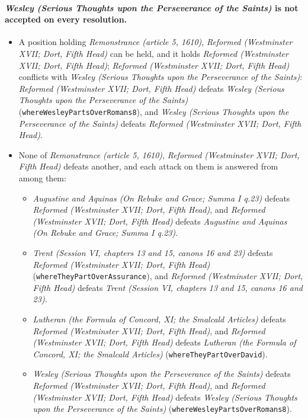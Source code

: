 \documentclass[11pt]{article}
\begin{document}
\paragraph{\emph{Wesley (Serious Thoughts upon the Perseverance of the Saints)} is not accepted on every resolution.}
\begin{itemize}
\item A position holding \emph{Remonstrance (article 5, 1610)}, \emph{Reformed (Westminster XVII; Dort, Fifth Head)} can be held, and it holds \emph{Reformed (Westminster XVII; Dort, Fifth Head)}; \emph{Reformed (Westminster XVII; Dort, Fifth Head)} conflicts with \emph{Wesley (Serious Thoughts upon the Perseverance of the Saints)}: \emph{Reformed (Westminster XVII; Dort, Fifth Head)} defeats \emph{Wesley (Serious Thoughts upon the Perseverance of the Saints)} (\texttt{where\allowbreak{}Wesley\allowbreak{}Parts\allowbreak{}Over\allowbreak{}Romans8}), and \emph{Wesley (Serious Thoughts upon the Perseverance of the Saints)} defeats \emph{Reformed (Westminster XVII; Dort, Fifth Head)}.
\item None of \emph{Remonstrance (article 5, 1610)}, \emph{Reformed (Westminster XVII; Dort, Fifth Head)} defeats another, and each attack on them is answered from among them:
\begin{itemize}
\item \emph{Augustine and Aquinas (On Rebuke and Grace; Summa I q.23)} defeats \emph{Reformed (Westminster XVII; Dort, Fifth Head)}, and \emph{Reformed (Westminster XVII; Dort, Fifth Head)} defeats \emph{Augustine and Aquinas (On Rebuke and Grace; Summa I q.23)}.
\item \emph{Trent (Session VI, chapters 13 and 15, canons 16 and 23)} defeats \emph{Reformed (Westminster XVII; Dort, Fifth Head)} (\texttt{where\allowbreak{}They\allowbreak{}Part\allowbreak{}Over\allowbreak{}Assurance}), and \emph{Reformed (Westminster XVII; Dort, Fifth Head)} defeats \emph{Trent (Session VI, chapters 13 and 15, canons 16 and 23)}.
\item \emph{Lutheran (the Formula of Concord, XI; the Smalcald Articles)} defeats \emph{Reformed (Westminster XVII; Dort, Fifth Head)}, and \emph{Reformed (Westminster XVII; Dort, Fifth Head)} defeats \emph{Lutheran (the Formula of Concord, XI; the Smalcald Articles)} (\texttt{where\allowbreak{}They\allowbreak{}Part\allowbreak{}Over\allowbreak{}David}).
\item \emph{Wesley (Serious Thoughts upon the Perseverance of the Saints)} defeats \emph{Reformed (Westminster XVII; Dort, Fifth Head)}, and \emph{Reformed (Westminster XVII; Dort, Fifth Head)} defeats \emph{Wesley (Serious Thoughts upon the Perseverance of the Saints)} (\texttt{where\allowbreak{}Wesley\allowbreak{}Parts\allowbreak{}Over\allowbreak{}Romans8}).
\end{itemize}
\end{itemize}
\end{document}
